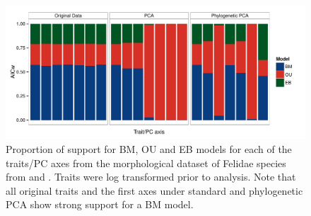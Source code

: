 \documentclass[12pt,twoside]{article}
\begin{document}





\begin{figure}[p]
\centering
\includegraphics[scale=0.65]{fig/felidae_aicw.pdf}
\caption[Model support on the Felidae dataset]{Proportion of support for BM, OU and EB models for each of the traits/PC axes from the morphological dataset of Felidae species from \citet{Slater_2009} and \citet{sakamoto_2010}. Traits were log transformed prior to analysis. Note that all original traits and the first axes under standard and phylogenetic PCA show strong support for a BM model.}
\label{felidae.aicw}
\end{figure}
\end{document}
